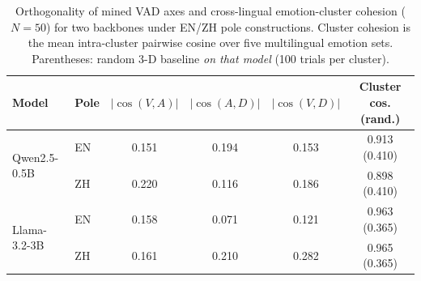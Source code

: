 \begin{table}[t]
\caption{Orthogonality of mined VAD axes and cross-lingual emotion-cluster cohesion ($N{=}50$) for two backbones under EN/ZH pole constructions. Cluster cohesion is the mean intra-cluster pairwise cosine over five multilingual emotion sets. Parentheses: random 3-D baseline \emph{on that model} (100 trials per cluster).}
\label{tab:e3_axis_cluster}
\centering
\footnotesize
\begin{tabular}{@{}llcccc@{}}
\toprule
Model & Pole & $|\cos(V,A)|$ & $|\cos(A,D)|$ & $|\cos(V,D)|$ & Cluster cos. (rand.) \\
\midrule
\multirow{2}{*}{Qwen2.5-0.5B}
 & EN & 0.151 & 0.194 & 0.153 & 0.913 (0.410) \\
 & ZH & 0.220 & 0.116 & 0.186 & 0.898 (0.410) \\
\midrule
\multirow{2}{*}{Llama-3.2-3B}
 & EN & 0.158 & 0.071 & 0.121 & 0.963 (0.365) \\
 & ZH & 0.161 & 0.210 & 0.282 & 0.965 (0.365) \\
\bottomrule
\end{tabular}
\end{table}
